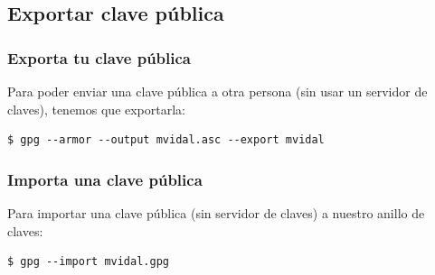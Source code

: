 \documentclass{beamer}
\begin{document}

\subsection{Exportar clave pública}

\begin{frame}[fragile]
\frametitle{Exporta tu clave pública}




Para poder enviar una clave pública a otra persona (sin usar un servidor de claves), tenemos que exportarla:
\begin{lstlisting}[frame=trBL]
$ gpg --armor --output mvidal.asc --export mvidal
\end{lstlisting}


\end{frame}


\begin{frame}[fragile]
\frametitle{Importa una clave pública}




Para importar una clave pública (sin servidor de claves) a nuestro anillo de claves:
\begin{lstlisting}[frame=trBL]
$ gpg --import mvidal.gpg
\end{lstlisting}


\end{frame}



\end{document}
